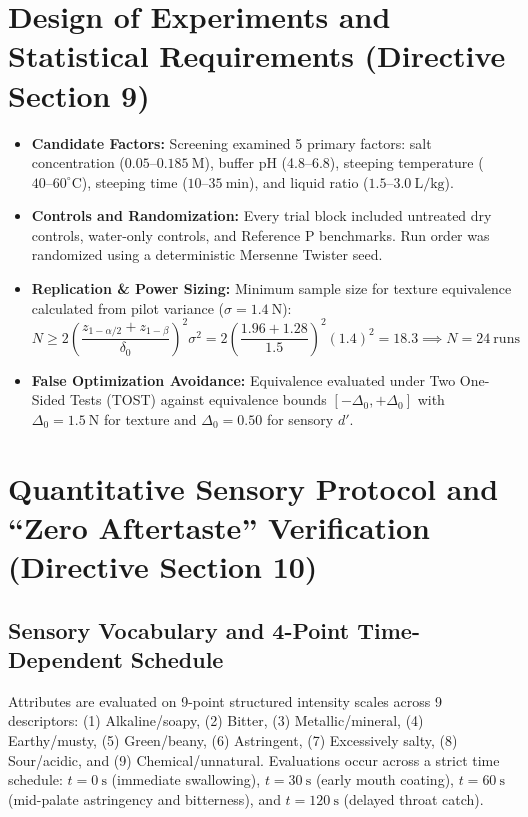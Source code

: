 \documentclass[10pt,a4paper]{article}
\begin{document}
\section{Design of Experiments and Statistical Requirements (Directive Section 9)}
\begin{itemize}
    \item \textbf{Candidate Factors:} Screening examined 5 primary factors: salt concentration ($0.05\text{--}0.185\ \mathrm{M}$), buffer pH (4.8--6.8), steeping temperature ($40\text{--}60^\circ\mathrm{C}$), steeping time ($10\text{--}35\ \mathrm{min}$), and liquid ratio ($1.5\text{--}3.0\ \mathrm{L/kg}$).
    \item \textbf{Controls and Randomization:} Every trial block included untreated dry controls, water-only controls, and Reference P benchmarks. Run order was randomized using a deterministic Mersenne Twister seed.
    \item \textbf{Replication \& Power Sizing:} Minimum sample size for texture equivalence calculated from pilot variance ($\sigma = 1.4\ \mathrm{N}$):
    \begin{equation}
    N \ge 2 \left( \frac{z_{1-\alpha/2} + z_{1-\beta}}{\delta_0} \right)^2 \sigma^2 = 2 \left( \frac{1.96 + 1.28}{1.5} \right)^2 (1.4)^2 = 18.3 \implies N = 24\ \text{runs}
    \end{equation}
    \item \textbf{False Optimization Avoidance:} Equivalence evaluated under Two One-Sided Tests (TOST) against equivalence bounds $[-\Delta_0, +\Delta_0]$ with $\Delta_0 = 1.5\ \mathrm{N}$ for texture and $\Delta_0 = 0.50$ for sensory $d'$.
\end{itemize}

\section{Quantitative Sensory Protocol and ``Zero Aftertaste'' Verification (Directive Section 10)}

\subsection{Sensory Vocabulary and 4-Point Time-Dependent Schedule}
Attributes are evaluated on 9-point structured intensity scales across 9 descriptors: (1) Alkaline/soapy, (2) Bitter, (3) Metallic/mineral, (4) Earthy/musty, (5) Green/beany, (6) Astringent, (7) Excessively salty, (8) Sour/acidic, and (9) Chemical/unnatural.
Evaluations occur across a strict time schedule: $t = 0\ \mathrm{s}$ (immediate swallowing), $t = 30\ \mathrm{s}$ (early mouth coating), $t = 60\ \mathrm{s}$ (mid-palate astringency and bitterness), and $t = 120\ \mathrm{s}$ (delayed throat catch).
\end{document}

